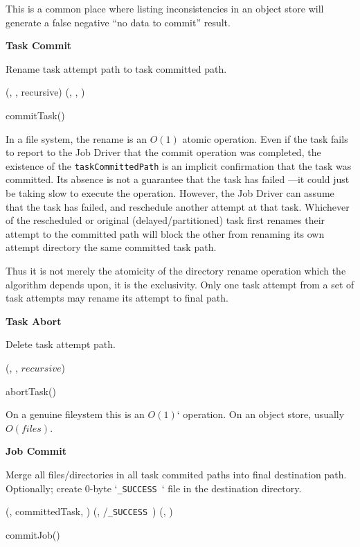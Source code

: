 \documentclass[conference]{IEEEtran}
\newcommand{\SUCCESS}{\texttt{\_SUCCESS}\ }
\begin{document}
This is a common place where listing inconsistencies in an object
store will generate a false negative ``no data to commit'' result.


\textbf{Task Commit}

Rename task attempt path to task committed path.

\begin{procedure}
\FileOutputCommitVars

\If{\exists(\fs, \taskAttemptPath)} {
  \delete(\fs, \taskCommittedPath, recursive)\;
  \rename(\fs, \taskAttemptPath, \taskCommittedPath)\;
}
\caption{commitTask()}
\end{procedure}


In a file system, the rename is an $O(1)$ atomic operation.
Even if the task fails to report to the Job Driver that the
commit operation was completed, the existence of the \texttt{taskCommittedPath}
is an implicit confirmation that the task was committed.
Its absence is not a guarantee that the task has failed ---it could just
be taking slow to execute the operation.
However, the Job Driver can assume that the task has failed,
and reschedule another attempt at that task.
Whichever of the rescheduled or original (delayed/partitioned) task
first renames their attempt to the committed path will block the other
from renaming its own attempt directory the same committed task path.

Thus it is not merely the atomicity of the directory rename operation
which the algorithm depends upon, it is the exclusivity.
Only one task attempt from a set of task attempts may rename its attempt to
final path.

\textbf{Task Abort}

Delete task attempt path.

\begin{procedure}
\FileOutputCommitVars

  \delete(\fs, \taskAttemptPath, $recursive$)\;

\caption{abortTask()}
\label{FileOutputCommitter.abortTask}
\end{procedure}


On a genuine fileystem this is an $O(1)$` operation.
On an object store, usually $O(files)$.

\textbf{Job Commit}

Merge all files/directories in all task commited paths into final destination path.
Optionally;
create 0-byte `\SUCCESS` file in the destination directory.

\begin{procedure*}
\FileOutputCommitVars

   {
    (\fs, committedTask, \dest)\;
  }
  \touch(\fs, \dest/\SUCCESS)\;
  \delete(\fs, \temp)\;

\caption{commitJob()}
\label{FileOutputCommitter.commitJob}
\end{procedure*}
\end{document}
